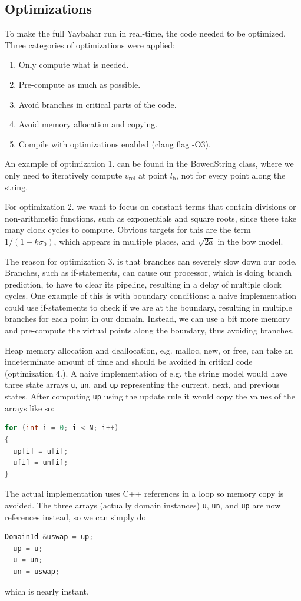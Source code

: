 \documentclass{article}
\begin{document}
\subsection{Optimizations}
\label{sec:optimizations}

To make the full Yaybahar run in real-time, the code needed to be optimized.
Three categories of optimizations were applied:
\begin{enumerate}
  \item Only compute what is needed.
  \item Pre-compute as much as possible.
  \item Avoid branches in critical parts of the code.
  \item Avoid memory allocation and copying.
  \item Compile with optimizations enabled (clang flag -O3).
\end{enumerate}
%
An example of optimization 1. can be found in the BowedString class, where we only need to iteratively compute $v_\text{rel}$ at point $l_\text{b}$, not for every point along the string.

For optimization 2. we want to focus on constant terms that contain divisions or non-arithmetic functions, such as exponentials and square roots, since these take many clock cycles to compute.
Obvious targets for this are the term $1 / (1 + k\sigma_0)$, which appears in multiple places, and $\sqrt{2a}$ in the bow model.

The reason for optimization 3. is that branches can severely slow down our code.
Branches, such as if-statements, can cause our processor, which is doing branch prediction, to have to clear its pipeline, resulting in a delay of multiple clock cycles.
One example of this is with boundary conditions: a naive implementation could use if-statements to check if we are at the boundary, resulting in multiple branches for each point in our domain.
Instead, we can use a bit more memory and pre-compute the virtual points along the boundary, thus avoiding branches.

Heap memory allocation and deallocation, e.g. malloc, new, or free, can take an indeterminate amount of time and should be avoided in critical code (optimization 4.).
A naive implementation of e.g. the string model would have three state arrays \lstinline{u}, \lstinline{un}, and \lstinline{up} representing the current, next, and previous states. After computing \lstinline{up} using the update rule it would copy the values of the arrays like so:
\begin{lstlisting}[language=C++]
for (int i = 0; i < N; i++)
{
  up[i] = u[i];
  u[i] = un[i];
}
\end{lstlisting}
The actual implementation uses C++ references in a loop so memory copy is avoided.
The three arrays (actually domain instances) \lstinline{u}, \lstinline{un}, and \lstinline{up} are now references instead, so we can simply do
\begin{lstlisting}[language=C++]
  Domain1d &uswap = up;
  up = u;
  u = un;
  un = uswap;
\end{lstlisting}
which is nearly instant.
\end{document}
